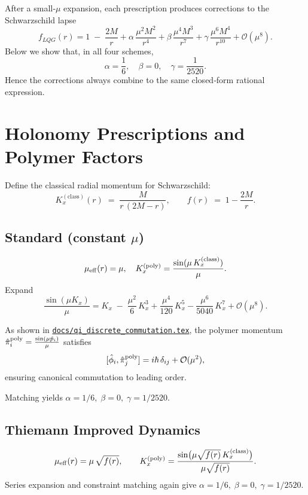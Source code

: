 \documentclass[11pt]{article}
\begin{document}
After a small‐$\mu$ expansion, each prescription produces corrections to the Schwarzschild lapse
\[
f_{LQG}(r) 
= 1 \;-\; \frac{2M}{r}
+ \alpha\,\frac{\mu^{2}M^{2}}{r^{4}}
+ \beta\,\frac{\mu^{4}M^{3}}{r^{7}}
+ \gamma\,\frac{\mu^{6}M^{4}}{r^{10}}
+ \mathcal{O}(\mu^{8}).
\]
Below we show that, in all four schemes, 
\[
\alpha = \frac{1}{6}, \quad \beta = 0, \quad \gamma = \frac{1}{2520}.
\]
Hence the corrections always combine to the same closed‐form rational expression.

\section{Holonomy Prescriptions and Polymer Factors}

Define the classical radial momentum for Schwarzschild:
\[
K_x^{(\text{class})}(r) \;=\; \frac{M}{r\,(2M - r)},
\qquad
f(r) \;=\; 1 - \frac{2M}{r}.
\]

\subsection{Standard (constant $\mu$)}

\[
\mu_{\rm eff}(r) = \mu, 
\quad
K_x^{(\text{poly})} = \frac{\sin(\mu\,K_x^{(\text{class})})}{\mu}.
\]
Expand
\[
\frac{\sin(\mu K_x)}{\mu} 
= K_x \;-\; \frac{\mu^2}{6}\,K_x^3 
  + \frac{\mu^4}{120}\,K_x^5 
  - \frac{\mu^6}{5040}\,K_x^7 + \mathcal{O}(\mu^8).
\]

\medskip
\noindent
As shown in 
\href{https://github.com/arcticoder/warp-bubble-qft/blob/main/docs/qi_discrete_commutation.tex}
     {\texttt{docs/qi\_discrete\_commutation.tex}}, 
the polymer momentum 
$\hat\pi_i^{\rm poly}=\tfrac{\sin(\mu\hat p_i)}{\mu}$ 
satisfies 
\[
  [\hat\phi_i,\hat\pi_j^{\rm poly}] = i\hbar\,\delta_{ij}
  + \mathcal O(\mu^2),
\]
ensuring canonical commutation to leading order.
\medskip

Matching yields \(\alpha=1/6,\;\beta=0,\;\gamma=1/2520.\)

\subsection{Thiemann Improved Dynamics~\cite{Thiemann1996}}

\[
\mu_{\rm eff}(r) = \mu\,\sqrt{f(r)}, 
\qquad
K_x^{(\text{poly})} = \frac{\sin\bigl(\mu \sqrt{f(r)}\,K_x^{(\text{class})}\bigr)}{\mu \sqrt{f(r)}}.
\]
Series expansion and constraint matching again give
\(\alpha=1/6,\;\beta=0,\;\gamma=1/2520.\)
\end{document}
